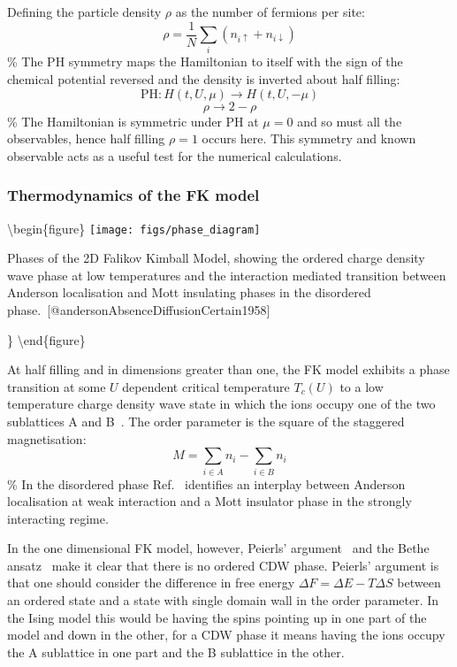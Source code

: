 Defining the particle density \(\rho\) as the number of fermions per site: \[
    \rho = \frac{1}{N} \sum_i \left( n_{i \uparrow} + n_{i \downarrow} \right)
\] \% The PH symmetry maps the Hamiltonian to itself with the sign of the chemical potential reversed and the density is inverted about half filling: \[ \text{PH} : H(t, U, \mu) \rightarrow H(t, U, -\mu) \] \[ \rho \rightarrow 2 - \rho \] \% The Hamiltonian is symmetric under PH at \(\mu = 0\) and so must all the observables, hence half filling \(\rho = 1\) occurs here. This symmetry and known observable acts as a useful test for the numerical calculations.

\hypertarget{thermodynamics-of-the-fk-model}{%
\subsubsection{Thermodynamics of the FK model}\label{thermodynamics-of-the-fk-model}}

\textbackslash begin\{figure\} \centering \texttt{[image: figs/phase\_diagram]}

\caption{Phases of the 2D Falikov Kimball Model, showing the ordered charge density wave phase at low temperatures and the interaction mediated transition between Anderson localisation and Mott insulating phases in the disordered phase.\ [@andersonAbsenceDiffusionCertain1958]}

\} \label{fig:FK_phase_diagram} \textbackslash end\{figure\}

At half filling and in dimensions greater than one, the FK model exhibits a phase transition at some \(U\) dependent critical temperature \(T_c(U)\) to a low temperature charge density wave state in which the ions occupy one of the two sublattices A and B~\autocite{maskaThermodynamicsTwodimensionalFalicovKimball2006}. The order parameter is the square of the staggered magnetisation: \[
M = \sum_{i \in A} n_i - \sum_{i \in B} n_i
\] \% In the disordered phase Ref.~\autocite{andersonAbsenceDiffusionCertain1958} identifies an interplay between Anderson localisation at weak interaction and a Mott insulator phase in the strongly interacting regime.

In the one dimensional FK model, however, Peierls' argument~\autocite{peierlsIsingModelFerromagnetism1936,kennedyItinerantElectronModel1986} and the Bethe ansatz~\autocite{liebAbsenceMottTransition1968} make it clear that there is no ordered CDW phase. Peierls' argument is that one should consider the difference in free energy \(\Delta F = \Delta E - T\Delta S\) between an ordered state and a state with single domain wall in the order parameter. In the Ising model this would be having the spins pointing up in one part of the model and down in the other, for a CDW phase it means having the ions occupy the A sublattice in one part and the B sublattice in the other.

